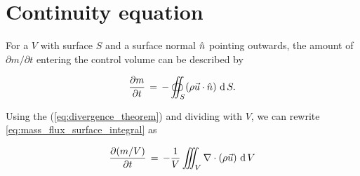 



\section{Continuity equation}

For a  $V$ with surface $S$ and a surface normal $\hat{n}$ pointing outwards, the amount of  $\partial m/\partial t$ entering the control volume can be described by

\begin{equation} \label{eq:mass_flux_surface_integral}
\frac{\partial m}{\partial t} \,=\, -\oiint_S(\rho\vec{u}\cdot\hat{n})\,\operatorname{d} S.
\end{equation}

Using the  (\eqref{eq:divergence_theorem}) and dividing with $V$, we can rewrite \eqref{eq:mass_flux_surface_integral} as

\begin{equation} \label{eq:mass_flux_volume_integral}
\frac{\partial (m/V)}{\partial t} \,=\, -\frac{1}{V}\iiint_V\nabla\cdot(\rho\vec{u})\,\operatorname{d} V
\end{equation}

